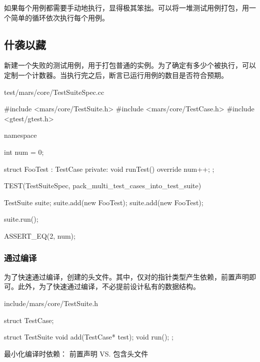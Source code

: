 \begin{content}

如果每个用例都需要手动地执行，显得极其笨拙。可以将一堆测试用例打包，用一个简单的循环依次执行每个用例。

\subsection{什袭以藏}

新建一个失败的测试用例，用于打包普通的实例。为了确定有多少个被执行，可以定制一个计数器。当执行完之后，断言已运行用例的数目是否符合预期。

\begin{nodiff}{test/mars/core/TestSuiteSpec.cc}
 \begin{c++}
#include <mars/core/TestSuite.h>
#include <mars/core/TestCase.h>
#include <gtest/gtest.h>

namespace {
  int num = 0;

  struct FooTest : TestCase {
  private:
    void runTest() override {
      num++;
    }
  };
}

TEST(TestSuiteSpec, pack_multi_test_cases_into_test_suite) {
  TestSuite suite;
  suite.add(new FooTest);
  suite.add(new FooTest);

  suite.run();

  ASSERT_EQ(2, num);
}
 \end{c++}
\end{nodiff}

\subsubsection{通过编译}

为了快速通过编译，创建的头文件。其中，仅对的指针类型产生依赖，前置声明即可。此外，为了快速通过编译，不必提前设计私有的数据结构。

\begin{nodiff}{include/mars/core/TestSuite.h}
 \begin{c++}
struct TestCase;

struct TestSuite {
  void add(TestCase* test);
  void run();
};
 \end{c++}
\end{nodiff}

\begin{episode}{最小化编译时依赖： 前置声明 VS. 包含头文件}

\begin{content}


\end{content}
\end{episode}
\end{content}
